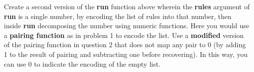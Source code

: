 \documentclass[12pt,letterpaper,boxed,cm]{hmcpset}
\newcommand{\tb}[1]{\textbf{#1}}
\begin{document}
\begin{solution}
    \vfill
\end{solution}
\newpage

\begin{problem} Create a second version of the \tb{run} function above wherein the \tb{rules} argument of \tb{run} is a single number, by encoding the list of rules into that number, then inside \tb{run} decomposing the number using numeric functions. Here you would use a \tb{pairing function} as in problem 1 to encode the list. Use a \tb{modified} version of the pairing function in question 2 that does not map any pair to 0 (by adding 1 to the result of pairing and subtracting one before recovering). In this way, you can use 0 to indicate the encoding of the empty list.
\end{problem}

\begin{solution}
    \vfill
\end{solution}
\newpage
\end{document}
